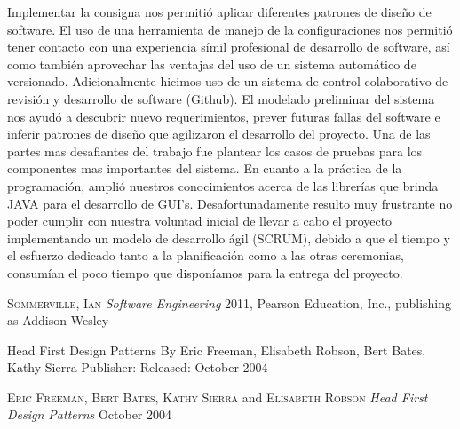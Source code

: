 \documentclass[10pt]{article} %
\begin{document}
Implementar la consigna nos permitió aplicar diferentes patrones de diseño de software.
El uso de una herramienta de manejo de la configuraciones nos permitió tener contacto con una experiencia símil profesional de desarrollo de software, así como también aprovechar las ventajas del uso de un sistema automático de versionado. Adicionalmente hicimos uso de un sistema de control colaborativo de revisión y desarrollo de software (Github).
El modelado preliminar del sistema nos ayudó a descubrir nuevo requerimientos, prever futuras fallas del software e inferir patrones de diseño que agilizaron el desarrollo del proyecto.
Una de las partes mas desafiantes del trabajo fue plantear los casos de pruebas para los componentes mas importantes del sistema.
En cuanto a la práctica de la programación, amplió nuestros conocimientos acerca de las librerías que brinda JAVA para el desarrollo de GUI's.
Desafortunadamente resulto muy frustrante no poder cumplir con nuestra voluntad inicial de llevar a cabo el proyecto implementando un modelo de desarrollo ágil (SCRUM), debido a que el tiempo y el esfuerzo dedicado tanto a la planificación como a las otras ceremonias, consumían el poco tiempo que disponíamos para la entrega del proyecto.



\begin{thebibliography}{99} %

 \textsc{Sommerville, Ian}
\textit{Software Engineering}
2011, Pearson Education, Inc., publishing as Addison-Wesley

Head First Design Patterns
By Eric Freeman, Elisabeth Robson, Bert Bates, Kathy Sierra
Publisher: 
Released: October 2004

 \textsc{Eric Freeman}, \textsc{Bert Bates}, \textsc{Kathy Sierra} and \textsc{Elisabeth Robson}
\textit{Head First Design Patterns}
October 2004


\end{thebibliography}

\end{document}
